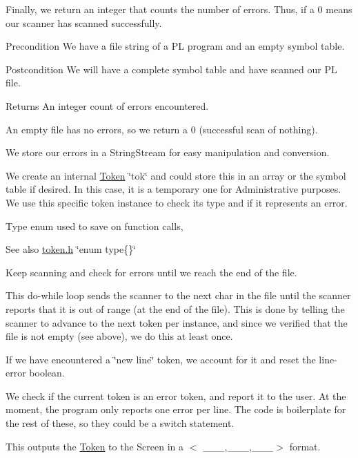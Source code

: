 Finally, we return an integer that counts the number of errors. Thus, if a 0 means our scanner has scanned successfully.

\begin{DoxyPrecond}{Precondition}
We have a file string of a PL program and an empty symbol table. 
\end{DoxyPrecond}
\begin{DoxyPostcond}{Postcondition}
We will have a complete symbol table and have scanned our PL file. 
\end{DoxyPostcond}
\begin{DoxyReturn}{Returns}
An integer count of errors encountered. 
\end{DoxyReturn}


An empty file has no errors, so we return a 0 (successful scan of nothing).

We store our errors in a StringStream for easy manipulation and conversion.

We create an internal \hyperlink{classToken}{Token} \char`\"{}tok\char`\"{} and could store this in an array or the symbol table if desired. In this case, it is a temporary one for Administrative purposes. We use this specific token instance to check its type and if it represents an error.

Type enum used to save on function calls, \begin{DoxySeeAlso}{See also}
\hyperlink{token_8h}{token.h} \char`\"{}enum type\{\}\char`\"{}
\end{DoxySeeAlso}
Keep scanning and check for errors until we reach the end of the file.

This do-\/while loop sends the scanner to the next char in the file until the scanner reports that it is out of range (at the end of the file). This is done by telling the scanner to advance to the next token per instance, and since we verified that the file is not empty (see above), we do this at least once.

If we have encountered a \char`\"{}new line\char`\"{} token, we account for it and reset the line-\/error boolean.

We check if the current token is an error token, and report it to the user. At the moment, the program only reports one error per line. The code is boilerplate for the rest of these, so they could be a switch statement.

This outputs the \hyperlink{classToken}{Token} to the Screen in a $<$ \_\-\_\-\_\-,\_\-\_\-\_\-,\_\-\_\-\_\-$>$ format.


